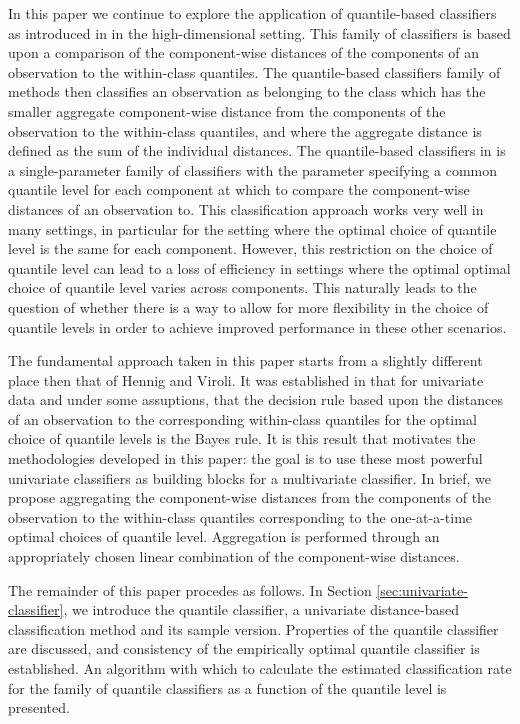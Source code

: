 In this paper we continue to explore the application of quantile-based
classifiers as introduced in \cite{hennig2016} in the high-dimensional setting.
This family of classifiers is based upon a comparison of the component-wise
distances of the components of an observation to the within-class quantiles.
The quantile-based classifiers family of methods then classifies an observation
as belonging to the class which has the smaller aggregate component-wise
distance from the components of the observation to the within-class quantiles,
and where the aggregate distance is defined as the sum of the individual
distances.  The quantile-based classifiers in \cite{hennig2016} is a
single-parameter family of classifiers with the parameter specifying a common
quantile level for each component at which to compare the component-wise
distances of an observation to.  This classification approach works very well in
many settings, in particular for the setting where the optimal choice of
quantile level is the same for each component.  However, this restriction on the
choice of quantile level can lead to a loss of efficiency in settings where the
optimal optimal choice of quantile level varies across components.  This
naturally leads to the question of whether there is a way to allow for more
flexibility in the choice of quantile levels in order to achieve improved
performance in these other scenarios.

The fundamental approach taken in this paper starts from a slightly different
place then that of Hennig and Viroli.  It was established in \cite{hennig2016}
that for univariate data and under some assuptions, that the decision rule based
upon the distances of an observation to the corresponding within-class quantiles
for the optimal choice of quantile levels is the Bayes rule.  It is this result
that motivates the methodologies developed in this paper: the goal is to use
these most powerful univariate classifiers as building blocks for a multivariate
classifier.  In brief, we propose aggregating the component-wise distances from
the components of the observation to the within-class quantiles corresponding to
the one-at-a-time optimal choices of quantile level.  Aggregation is performed
through an appropriately chosen linear combination of the component-wise
distances.

The remainder of this paper procedes as follows.  In Section
\ref{sec:univariate-classifier}, we introduce the quantile classifier, a
univariate distance-based classification method and its sample version.
Properties of the quantile classifier are discussed, and consistency of the
empirically optimal quantile classifier is established.  An algorithm with which
to calculate the estimated classification rate for the family of quantile
classifiers as a function of the quantile level is presented.

